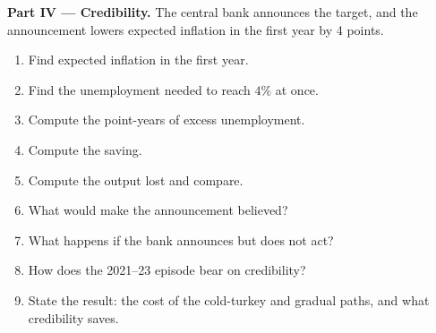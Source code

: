 \begin{problem}
\medskip\noindent\textbf{Part IV --- Credibility.} The central bank announces the
target, and the announcement lowers expected inflation in the first year
by 4 points.
\begin{enumerate}[resume]
  \item Find expected inflation in the first year.
  \item Find the unemployment needed to reach $4\%$ at once.
  \item Compute the point-years of excess unemployment.
  \item Compute the saving.
  \item Compute the output lost and compare.
  \item What would make the announcement believed?
  \item What happens if the bank announces but does not act?
  \item How does the 2021--23 episode bear on credibility?
  \item State the result: the cost of the cold-turkey and gradual paths, and what credibility saves.
\end{enumerate}
\end{problem}

